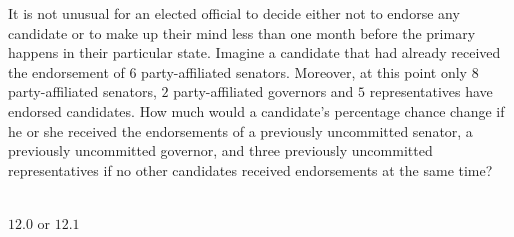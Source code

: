  
It is not unusual for an elected official to decide either not to endorse any candidate or to make up their mind less than one month before the primary happens in their particular state.  Imagine a candidate that had already received the endorsement of $6$ party-affiliated senators.  Moreover, at this point only $8$ party-affiliated senators, $2$ party-affiliated governors and $5$ representatives have endorsed candidates. How much would a candidate's percentage chance change if he or she received the endorsements of a previously uncommitted senator, a previously uncommitted governor, and three previously uncommitted representatives if no other candidates received endorsements at the same time?\\\\


\ifsat
	\begin{enumerate}[label=\Alph*)]
	\end{enumerate}
\else
\fi

\ifacteven
	\begin{enumerate}[label=\textbf{\Alph*.},itemsep=\fill,align=left]
	\end{enumerate}
\else
\fi

\ifactodd
	\begin{enumerate}[label=\textbf{\Alph*.},itemsep=\fill,align=left]
	\end{enumerate}
\else
\fi

\ifgridin
$12.0$ or $12.1 $
\else
\fi

